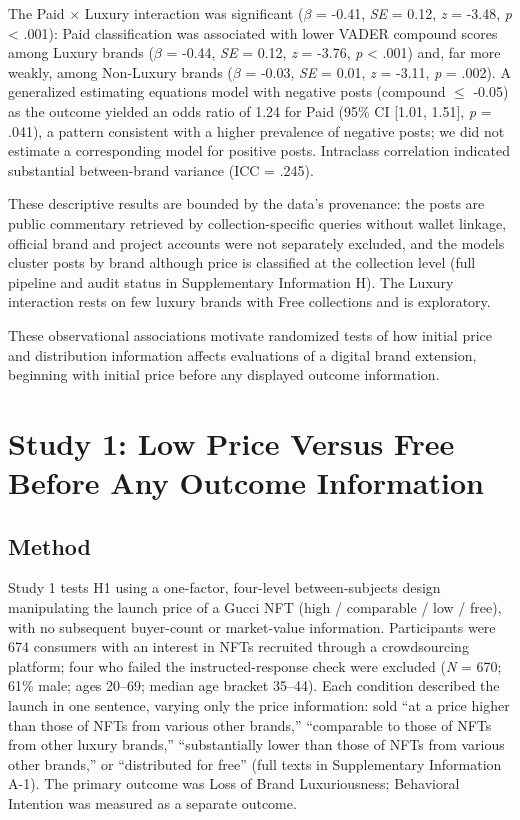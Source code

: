 \documentclass[12pt, a4paper]{article}
\begin{document}
The Paid $\times$ Luxury interaction was significant ($\beta$ = -0.41, \emph{SE} = 0.12, \emph{z} = -3.48, \emph{p} \textless{} .001): Paid classification was associated with lower VADER compound scores among Luxury brands ($\beta$ = -0.44, \emph{SE} = 0.12, \emph{z} = -3.76, \emph{p} \textless{} .001) and, far more weakly, among Non-Luxury brands ($\beta$ = -0.03, \emph{SE} = 0.01, \emph{z} = -3.11, \emph{p} = .002). A generalized estimating equations model with negative posts (compound $\leq$ -0.05) as the outcome yielded an odds ratio of 1.24 for Paid (95\% CI {[}1.01, 1.51{]}, \emph{p} = .041), a pattern consistent with a higher prevalence of negative posts; we did not estimate a corresponding model for positive posts. Intraclass correlation indicated substantial between-brand variance (ICC = .245).

These descriptive results are bounded by the data's provenance: the posts are public commentary retrieved by collection-specific queries without wallet linkage, official brand and project accounts were not separately excluded, and the models cluster posts by brand although price is classified at the collection level (full pipeline and audit status in Supplementary Information H). The Luxury interaction rests on few luxury brands with Free collections and is exploratory.

These observational associations motivate randomized tests of how initial price and distribution information affects evaluations of a digital brand extension, beginning with initial price before any displayed outcome information.

\section{Study 1: Low Price Versus Free Before Any Outcome Information}

\subsection{Method}

Study 1 tests H1 using a one-factor, four-level between-subjects design manipulating the launch price of a Gucci NFT (high / comparable / low / free), with no subsequent buyer-count or market-value information. Participants were 674 consumers with an interest in NFTs recruited through a crowdsourcing platform; four who failed the instructed-response check were excluded (\emph{N} = 670; 61\% male; ages 20--69; median age bracket 35--44). Each condition described the launch in one sentence, varying only the price information: sold ``at a price higher than those of NFTs from various other brands,'' ``comparable to those of NFTs from other luxury brands,'' ``substantially lower than those of NFTs from various other brands,'' or ``distributed for free'' (full texts in Supplementary Information A-1). The primary outcome was Loss of Brand Luxuriousness; Behavioral Intention was measured as a separate outcome.
\end{document}
